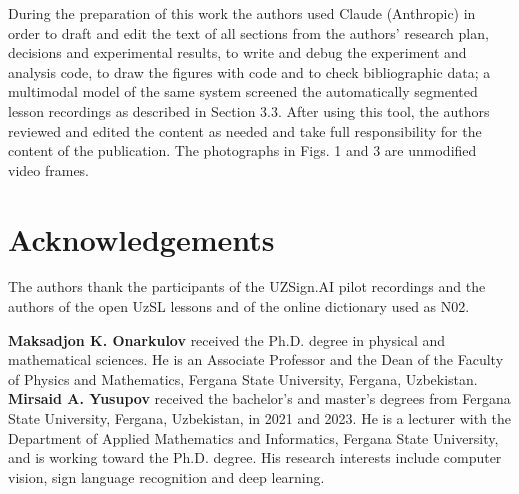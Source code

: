 \documentclass[a4paper,fleqn]{cas-dc}
\begin{document}
During the preparation of this work the authors used Claude (Anthropic) \cite{2026_anthropic_claude} in order to draft and edit the text of all sections from the authors' research plan, decisions and experimental results, to write and debug the experiment and analysis code, to draw the figures with code and to check bibliographic data; a multimodal model of the same system screened the automatically segmented lesson recordings as described in Section 3.3. After using this tool, the authors reviewed and edited the content as needed and take full responsibility for the content of the publication. The photographs in Figs. 1 and 3 are unmodified video frames.

\hypertarget{acknowledgements}{%
\section*{Acknowledgements}\label{acknowledgements}}

The authors thank the participants of the UZSign.AI pilot recordings and the authors of the open UzSL lessons and of the online dictionary used as N02.



\bio{}
\textbf{Maksadjon K. Onarkulov} received the Ph.D. degree in physical and mathematical sciences. He is an Associate Professor and the Dean of the Faculty of Physics and Mathematics, Fergana State University, Fergana, Uzbekistan.
\endbio
\bio{}
\textbf{Mirsaid A. Yusupov} received the bachelor's and master's degrees from Fergana State University, Fergana, Uzbekistan, in 2021 and 2023. He is a lecturer with the Department of Applied Mathematics and Informatics, Fergana State University, and is working toward the Ph.D. degree. His research interests include computer vision, sign language recognition and deep learning.
\endbio
\end{document}
